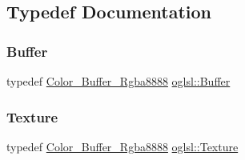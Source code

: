 \subsection{Typedef Documentation}
\mbox{\label{namespaceoglsl_a54a481d3b94c4faefeb16560e4b85a34}} 
\subsubsection{\texorpdfstring{Buffer}{Buffer}}
{\footnotesize\ttfamily typedef \mbox{\hyperlink{classoglsl_1_1_color___buffer___rgba8888}{Color\+\_\+\+Buffer\+\_\+\+Rgba8888}} \mbox{\hyperlink{namespaceoglsl_a54a481d3b94c4faefeb16560e4b85a34}{oglsl\+::\+Buffer}}}

\mbox{\label{namespaceoglsl_a3f3bf2d9553fda1a155d7492ee30d7d0}} 
\subsubsection{\texorpdfstring{Texture}{Texture}}
{\footnotesize\ttfamily typedef \mbox{\hyperlink{classoglsl_1_1_color___buffer___rgba8888}{Color\+\_\+\+Buffer\+\_\+\+Rgba8888}} \mbox{\hyperlink{namespaceoglsl_a3f3bf2d9553fda1a155d7492ee30d7d0}{oglsl\+::\+Texture}}}

